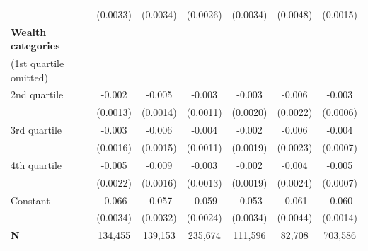 {\begin{tabular}{l*{6}{c}}
                    &    (0.0033)        &    (0.0034)        &    (0.0026)        &    (0.0034)        &    (0.0048)        &    (0.0015)        \\
\addlinespace
\textbf{Wealth categories} \\ (1st quartile omitted)&                    &                    &                    &                    &                    &                    \\
\addlinespace
\hspace*{1em}2nd quartile        &      -0.002\sym{*} &      -0.005\sym{**}&      -0.003\sym{**}&      -0.003\sym{*} &      -0.006\sym{*} &      -0.003\sym{**}\\
                    &    (0.0013)        &    (0.0014)        &    (0.0011)        &    (0.0020)        &    (0.0022)        &    (0.0006)        \\
\addlinespace
\hspace*{1em}3rd quartile        &      -0.003\sym{*} &      -0.006\sym{**}&      -0.004\sym{**}&      -0.002\sym{*} &      -0.006\sym{**}&      -0.004\sym{**}\\
                    &    (0.0016)        &    (0.0015)        &    (0.0011)        &    (0.0019)        &    (0.0023)        &    (0.0007)        \\
\addlinespace
\hspace*{1em}4th quartile        &      -0.005\sym{*} &      -0.009\sym{**}&      -0.003\sym{*} &      -0.002\sym{*} &      -0.004\sym{*} &      -0.005\sym{**}\\
                    &    (0.0022)        &    (0.0016)        &    (0.0013)        &    (0.0019)        &    (0.0024)        &    (0.0007)        \\
\addlinespace
\hspace*{1em}Constant            &      -0.066\sym{**}&      -0.057\sym{**}&      -0.059\sym{**}&      -0.053\sym{**}&      -0.061\sym{**}&      -0.060\sym{**}\\
                    &    (0.0034)        &    (0.0032)        &    (0.0024)        &    (0.0034)        &    (0.0044)        &    (0.0014)        \\
\midrule
\textbf{N}          &     134,455        &     139,153        &     235,674        &     111,596        &      82,708        &     703,586        \\
\bottomrule
\end{tabular}
}
